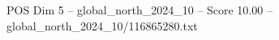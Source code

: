 \begin{textsample}{POS Dim 5 – global\_north\_2024\_10 – Score 10.00 – global\_north\_2024\_10/116865280.txt}
\end{textsample}
